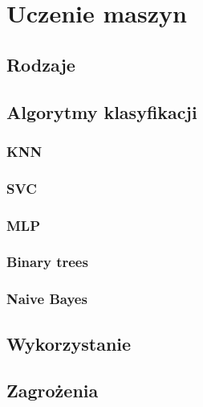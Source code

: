 \chapter{Uczenie maszyn}
\section{Rodzaje}
\section{Algorytmy klasyfikacji}
\subsection{KNN}
\subsection{SVC}
\subsection{MLP}
\subsection{Binary trees}
\subsection{Naive Bayes}
\section{Wykorzystanie}
\section{Zagrożenia}